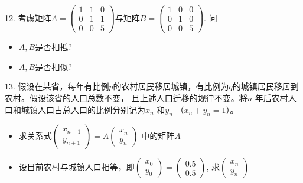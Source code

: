 
\begin{frame}

12. 考虑矩阵$A = \begin{pmatrix} 1 & 1 & 0 \\ 0 & 1 & 1 \\ 0 & 0 & 5 \end{pmatrix}$与矩阵$B = \begin{pmatrix} 1 & 0 & 0 \\ 0 & 1 & 0 \\ 0 & 0 & 5 \end{pmatrix}$. 问
\begin{itemize}
\item[(1)] $A,B$是否相抵?
\item[(2)] $A,B$是否相似?
\end{itemize}

\vspace{1em}

13. 假设在某省，每年有比例$p$的农村居民移居城镇，有比例为$q$的城镇居民移居到农村。假设该省的人口总数不变，
且上述人口迁移的规律不变。将$n$ 年后农村人口和城镇人口占总人口的比例分别记为$x_n$ 和$y_n$ （$x_n+y_n=1$）。
\begin{itemize}
\item[(1)] 求关系式$\begin{pmatrix} x_{n+1} \\ y_{n+1} \end{pmatrix} = A \begin{pmatrix} x_n \\ y_n \end{pmatrix}$ 中的矩阵$A$
\item[(2)] 设目前农村与城镇人口相等，即$\begin{pmatrix} x_0 \\ y_0 \end{pmatrix} = \begin{pmatrix} 0.5 \\ 0.5 \end{pmatrix}$,
求$\begin{pmatrix} x_{n} \\ y_{n} \end{pmatrix}$
\end{itemize}

\end{frame}


